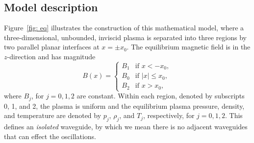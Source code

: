 \documentclass[12pt]{../style-files/ociamthesis}
\begin{document}
\subsection{Model description}
Figure~\ref{fig: eq} illustrates the construction of this mathematical model, where a three-dimensional, unbounded, inviscid plasma is separated into three regions by two parallel planar interfaces at $x = \pm x_0$. The equilibrium magnetic field is in the $z$-direction and has magnitude
\begin{equation}
	B(x)=
	\begin{cases}
		B_1 & \text{if } x < -x_0, \\
		B_0 & \text{if } |x|\leq{x_0}, \\
		B_2 & \text{if } x > x_0,
	\end{cases}
\end{equation}
where $B_j$, for $j = 0, 1, 2$ are constant. Within each region, denoted by subscripts 0, 1, and 2, the plasma is uniform and the equilibrium plasma pressure, density, and temperature are denoted by $p_j$, $\rho_j$, and $T_j$, respectively, for $j = 0, 1, 2$. This defines an \textit{isolated} waveguide, by which we mean there is no adjacent waveguides that can effect the oscillations.
\end{document}
